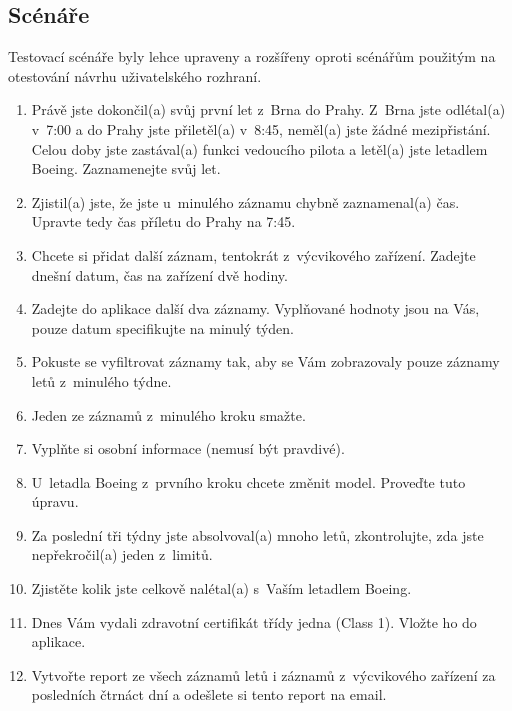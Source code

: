 \documentclass[thesis=M,czech]{FITthesis}[2012/06/26]
\begin{document}
\subsection{Scénáře}
Testovací scénáře byly lehce upraveny a rozšířeny oproti scénářům použitým na otestování návrhu uživatelského rozhraní.

\begin{enumerate}
\item Právě jste dokončil(a) svůj první let z~Brna do Prahy. Z~Brna jste odlétal(a) v~7:00 a do Prahy jste přiletěl(a) v~8:45, neměl(a) jste žádné mezipřistání. Celou doby jste zastával(a) funkci vedoucího pilota a letěl(a) jste letadlem Boeing. Zaznamenejte svůj let.
\item Zjistil(a) jste, že jste u~minulého záznamu chybně zaznamenal(a) čas. Upravte tedy čas příletu do Prahy na 7:45.
\item Chcete si přidat další záznam, tentokrát z~výcvikového zařízení. Zadejte dnešní datum, čas na zařízení dvě hodiny.
\item Zadejte do aplikace další dva záznamy. Vyplňované hodnoty jsou na Vás, pouze datum specifikujte na minulý týden.
\item Pokuste se vyfiltrovat záznamy tak, aby se Vám zobrazovaly pouze záznamy letů z~minulého týdne.
\item Jeden ze záznamů z~minulého kroku smažte.
\item Vyplňte si osobní informace (nemusí být pravdivé).
\item U~letadla Boeing z~prvního kroku chcete změnit model. Proveďte tuto úpravu.
\item Za poslední tři týdny jste absolvoval(a) mnoho letů, zkontrolujte, zda jste nepřekročil(a) jeden z~limitů.
\item Zjistěte kolik jste celkově nalétal(a) s~Vaším letadlem Boeing.
\item Dnes Vám vydali zdravotní certifikát třídy jedna (Class 1). Vložte ho do aplikace.
\item Vytvořte report ze všech záznamů letů i záznamů z~výcvikového zařízení za posledních čtrnáct dní a odešlete si tento report na email.
\end{enumerate}
\end{document}
